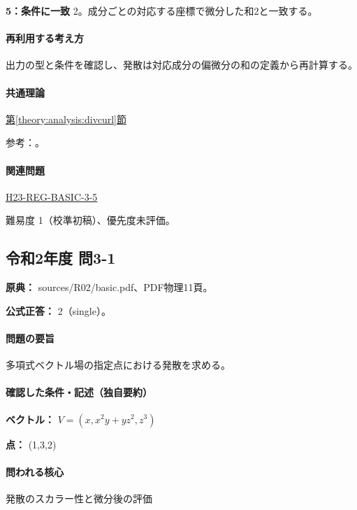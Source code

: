 \noindent\textbf{5：条件に一致} 2。成分ごとの対応する座標で微分した和2と一致する。\par

\paragraph{再利用する考え方} 出力の型と条件を確認し、発散は対応成分の偏微分の和の定義から再計算する。

\paragraph{共通理論} \hyperref[theory:analysis:divcurl]{第\ref*{theory:analysis:divcurl}節}

\par 参考：\cite{mit_vectorcalc2005}。

\paragraph{関連問題} \hyperref[q:h23-reg-basic-3-5]{H23-REG-BASIC-3-5}

\par 難易度 1（校準初稿）、優先度未評価。

\subsection{令和2年度 問3-1}
\label{q:r02-reg-basic-3-1}

\noindent\textbf{原典：} sources/R02/basic.pdf、PDF物理11頁。

\textbf{公式正答：} 2（single）。

\paragraph{問題の要旨} 多項式ベクトル場の指定点における発散を求める。

\paragraph{確認した条件・記述（独自要約）}\mbox{}\par

\noindent\textbf{ベクトル：} \(V=(x,x^2y+yz^2,z^3)\)\par

\noindent\textbf{点：} (1,3,2)\par

\paragraph{問われる核心} 発散のスカラー性と微分後の評価

